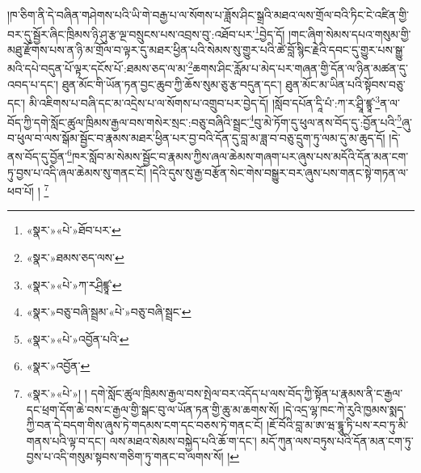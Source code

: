 །ཁ་ཅིག་ནི་དེ་བཞིན་གཤེགས་པའི་ཡི་གེ་བརྒྱ་པ་ལ་སོགས་པ་ཟློས་ཤིང་སྒྲའི་མཐའ་ལས་གྲོལ་བའི་ཏིང་ངེ་འཛིན་གྱི་བར་དུ་སྦྱོར་ཞིང་ཁྲིམས་ཉི་ཤུ་རྩ་ལྔ་བསྲུངས་པས་འབྲས་བུ་:འཐོབ་པར་\footnote{«སྣར་»«པེ་»ཐོབ་པར་}བྱེད་དོ། །གང་ཞིག་སེམས་དཔའ་གསུམ་གྱི་མཐུ་རྫོགས་པས་ན་ཉི་མ་གྲོལ་བ་ལྟར་དུ་མཐར་ཕྱིན་པའི་སེམས་སུ་གྱུར་པའི་ཚེ་བློ་སྙིང་རྗེའི་དབང་དུ་གྱུར་པས་སྒྱུ་མའི་དཔེ་བདུན་པོ་ལྟར་དངོས་པོ་:ཐམས་ཅད་ལ་མ་\footnote{«སྣར་»ཐམས་ཅད་ལས་}ཆགས་ཤིང་རློམ་པ་མེད་པར་གཞན་གྱི་དོན་ལ་ཉིན་མཚན་དུ་འབད་པ་དང་། ཐུན་མོང་གི་ཡོན་ཏན་བྱང་ཆུབ་ཀྱི་ཆོས་སུམ་ཅུ་རྩ་བདུན་དང་། ཐུན་མོང་མ་ཡིན་པའི་སྟོབས་བཅུ་དང་། མི་འཇིགས་པ་བཞི་དང་མ་འདྲེས་པ་ལ་སོགས་པ་འགྲུབ་པར་བྱེད་དོ། །སློབ་དཔོན་དཱི་པཾ་:ཀ་ར་ཤྲཱི་ཛྙཱ་\footnote{«སྣར་»«པེ་»ཀ་རཤྲིཛྙཱ་}ན་ལ་བོད་ཀྱི་དགེ་སློང་ཚུལ་ཁྲིམས་རྒྱལ་བས་གསེར་སྲང་:བཅུ་བཞིའི་སྦྲང་\footnote{«སྣར་»བཅུ་བཞི་སྦྲམ་«པེ་»བཅུ་བཞི་སྦྲང་}བུ་མེ་ཏོག་དུ་ཕུལ་ནས་བོད་དུ་:བྱོན་པའི་\footnote{«སྣར་»«པེ་»འབྱོན་པའི་}ཞུ་བ་ཕུལ་བ་ལས་སྒོམ་སྦྱོང་བ་རྣམས་མཐར་ཕྱིན་པར་བྱ་བའི་དོན་དུ་བླ་མ་ཟླ་བ་བཅུ་དྲུག་ཏུ་ལམ་དུ་མ་ཆུད་དོ། །དེ་ནས་བོད་དུ་བྱོན་\footnote{«སྣར་»འབྱོན་}ཁར་སློབ་མ་སེམས་སྦྱོང་བ་རྣམས་ཀྱིས་ཞལ་ཆེམས་གཞག་པར་ཞུས་པས་མདོའི་དོན་མན་ངག་ཏུ་བྱས་པ་འདི་ཞལ་ཆེམས་སུ་གནང་ངོ། །དེའི་དུས་སུ་རྒྱ་བརྩོན་སེང་གེས་བསྒྱུར་བར་ཞུས་པས་གནང་སྟེ་གཏན་ལ་ཕབ་པོ། ། \footnote{«སྣར་»«པེ་»། ། དགེ་སློང་ཚུལ་ཁྲིམས་རྒྱལ་བས་སྤེལ་བར་འདོད་པ་ལས་བོད་ཀྱི་སྟོན་པ་རྣམས་ནི་ང་རྒྱལ་དང་ཕྲག་དོག་ཆེ་བས་ང་རྒྱལ་གྱི་སྒང་བུ་ལ་ཡོན་ཏན་གྱི་ཆུ་མ་ཆགས་སོ། །དེ་འདྲ་ལྷ་ཁང་ཀེ་རུའི་ཁྱམས་སྨད་ཀྱི་བན་དེ་བདག་གིས་ཞུས་ཏེ་གདམས་ངག་དང་བཅས་ཏེ་གནང་ངོ། །ཇོ་བོའི་བླ་མ་ཨ་ཝ་དྷཱུ་ཏི་པས་རབ་ཏུ་མི་གནས་པའི་ལྟ་བ་དང་། ལས་མཐའ་སེམས་བསྐྱེད་པའི་ཆོ་ག་དང་། མདོ་ཀུན་ལས་བཏུས་པའི་དོན་མན་ངག་ཏུ་བྱས་པ་འདི་གསུམ་སྟབས་གཅིག་ཏུ་གནང་བ་ལགས་སོ། །}